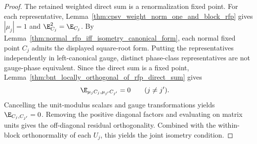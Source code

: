 \begin{proof}\leanok
    The retained weighted direct sum is a renormalization fixed point. For each
    representative, Lemma~\ref{thm:cpsv_weight_norm_one_and_block_rfp}
    gives $|\mu_j|=1$ and $\E_{C_j}^2=\E_{C_j}$. By
    Lemma~\ref{thm:normal_rfp_iff_isometry_canonical_form}, each normal fixed
    point $C_j$ admits the displayed square-root form. Putting the
    representatives independently in left-canonical gauge, distinct phase-class
    representatives are not gauge-phase equivalent. Since the direct sum is a
    fixed point, Lemma~\ref{thm:bnt_locally_orthogonal_of_rfp_direct_sum}
    gives
    \begin{align}
        \E_{\mu_jC_j,\mu_{j'}C_{j'}} & =0
        \qquad (j\ne j').
        \notag
    \end{align}
    Cancelling the unit-modulus scalars and gauge transformations yields
    $\E_{C_j,C_{j'}}=0$. Removing the positive diagonal factors and evaluating
    on matrix units gives the off-diagonal residual orthogonality. Combined
    with the within-block orthonormality of each $U_j$, this yields the joint
    isometry condition.
\end{proof}

